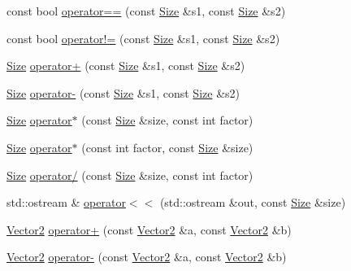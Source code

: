 \begin{DoxyCompactItemize}
const bool \hyperlink{namespaceprism_1_1geometry_af53e74df9eddb7d73ec539fb15c46dde}{operator==} (const \hyperlink{classprism_1_1geometry_1_1_size}{Size} \&s1, const \hyperlink{classprism_1_1geometry_1_1_size}{Size} \&s2)
\item 
const bool \hyperlink{namespaceprism_1_1geometry_a2ef633daa7d7bbe9cb4fe70ab770cf39}{operator!=} (const \hyperlink{classprism_1_1geometry_1_1_size}{Size} \&s1, const \hyperlink{classprism_1_1geometry_1_1_size}{Size} \&s2)
\item 
\hyperlink{classprism_1_1geometry_1_1_size}{Size} \hyperlink{namespaceprism_1_1geometry_a34fd6c95375eb8c409cebf1d15a05927}{operator+} (const \hyperlink{classprism_1_1geometry_1_1_size}{Size} \&s1, const \hyperlink{classprism_1_1geometry_1_1_size}{Size} \&s2)
\item 
\hyperlink{classprism_1_1geometry_1_1_size}{Size} \hyperlink{namespaceprism_1_1geometry_ac2e9de798c8cbdc4e5f73da2b036282a}{operator-\/} (const \hyperlink{classprism_1_1geometry_1_1_size}{Size} \&s1, const \hyperlink{classprism_1_1geometry_1_1_size}{Size} \&s2)
\item 
\hyperlink{classprism_1_1geometry_1_1_size}{Size} \hyperlink{namespaceprism_1_1geometry_a9fa80bd81f2cd9e7d38703575ef5449e}{operator$\ast$} (const \hyperlink{classprism_1_1geometry_1_1_size}{Size} \&size, const int factor)
\item 
\hyperlink{classprism_1_1geometry_1_1_size}{Size} \hyperlink{namespaceprism_1_1geometry_aa57c88aee9ae82d739964fb777d46fa4}{operator$\ast$} (const int factor, const \hyperlink{classprism_1_1geometry_1_1_size}{Size} \&size)
\item 
\hyperlink{classprism_1_1geometry_1_1_size}{Size} \hyperlink{namespaceprism_1_1geometry_a45e511c531810fe58e367ee790d27e93}{operator/} (const \hyperlink{classprism_1_1geometry_1_1_size}{Size} \&size, const int factor)
\item 
std\+::ostream \& \hyperlink{namespaceprism_1_1geometry_a8897a618775f0d23046ec67381ed1f71}{operator$<$$<$} (std\+::ostream \&out, const \hyperlink{classprism_1_1geometry_1_1_size}{Size} \&size)
\item 
\hyperlink{classprism_1_1geometry_1_1_vector2}{Vector2} \hyperlink{namespaceprism_1_1geometry_a27096c3f5e812cfe360abe97520be336}{operator+} (const \hyperlink{classprism_1_1geometry_1_1_vector2}{Vector2} \&a, const \hyperlink{classprism_1_1geometry_1_1_vector2}{Vector2} \&b)
\item 
\hyperlink{classprism_1_1geometry_1_1_vector2}{Vector2} \hyperlink{namespaceprism_1_1geometry_a3631c45068f5df482e2d1b2ed6f59b11}{operator-\/} (const \hyperlink{classprism_1_1geometry_1_1_vector2}{Vector2} \&a, const \hyperlink{classprism_1_1geometry_1_1_vector2}{Vector2} \&b)

\end{DoxyCompactItemize}
